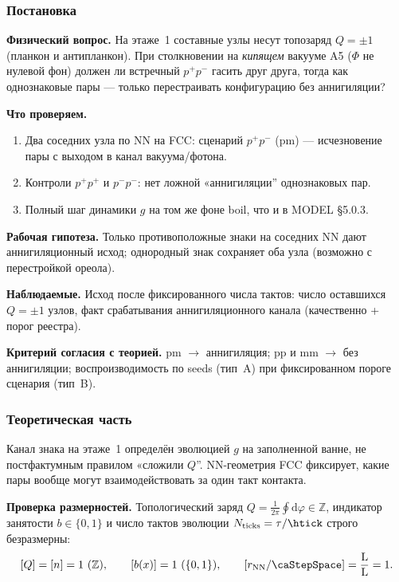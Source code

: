 \label{exp:cef01}

\subsubsection*{Постановка}
\textbf{Физический вопрос.}
На этаже~1 составные узлы несут топозаряд $Q=\pm1$ (планкон и антипланкон).
При столкновении на \emph{кипящем} вакууме A5 ($\Phi$ не нулевой фон) должен ли встречный $p^+p^-$ гасить друг друга, тогда как однознаковые пары --- только перестраивать конфигурацию без аннигиляции?

\textbf{Что проверяем.}
\begin{enumerate}[label=\textbf{(\alph*)},leftmargin=*,itemsep=0.25em]
\item Два соседних узла по NN на FCC: сценарий $p^+p^-$ (pm) --- исчезновение пары с выходом в канал вакуума/фотона.
\item Контроли $p^+p^+$ и $p^-p^-$: нет ложной «аннигиляции'' однознаковых пар.
\item Полный шаг динамики $g$ на том же фоне boil, что и в MODEL §5.0.3.
\end{enumerate}

\textbf{Рабочая гипотеза.}
Только противоположные знаки на соседних NN дают аннигиляционный исход; однородный знак сохраняет оба узла (возможно с перестройкой ореола).

\textbf{Наблюдаемые.}
Исход после фиксированного числа тактов: число оставшихся $Q=\pm1$ узлов, факт срабатывания аннигиляционного канала (качественно + порог реестра).

\textbf{Критерий согласия с теорией.}
pm $\to$ аннигиляция; pp и mm $\to$ без аннигиляции; воспроизводимость по seeds (тип~A) при фиксированном пороге сценария (тип~B).

\subsubsection*{Теоретическая часть}
Канал знака на этаже~1 определён эволюцией $g$ на заполненной ванне, не постфактумным правилом «сложили $Q$''.
NN-геометрия FCC фиксирует, какие пары вообще могут взаимодействовать за один такт контакта.

\textbf{Проверка размерностей.}
Топологический заряд $Q = \frac{1}{2\pi}\oint\mathrm{d}\varphi \in \mathbb{Z}$, индикатор занятости $b\in\{0,1\}$ и число тактов эволюции $N_{\mathrm{ticks}} = \tau/\htick$ строго безразмерны:
\[
  [Q] = [n] = 1\ (\mathbb{Z}),\qquad
  [b(x)] = 1\ (\{0,1\}),\qquad
  [r_{\mathrm{NN}}/\caStepSpace] = \frac{\mathrm{L}}{\mathrm{L}} = 1.
\]

